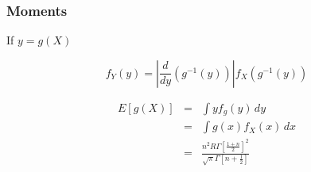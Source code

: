 \subsubsection{Moments}


If $y = g(X)$

\[ f_Y(y) = \left| \frac{d}{dy} \left( g^{-1}(y) \right) \right|
               f_X\left( g^{-1}(y) \right)
\]


\begin{eqnarray}
 E[ g(X) ] & = & \int y f_g (y) \, dy  \nonumber \\
           & = & \int g(x) f_X(x) \, dx  \nonumber \\
           & = &  \frac{n^{2}  R  {\Gamma\left[ \frac{1 + n}{2} \right]}^{2} }{ \sqrt{\pi} \Gamma\left[ n + \frac{1}{2} \right]  }            
\end{eqnarray}

